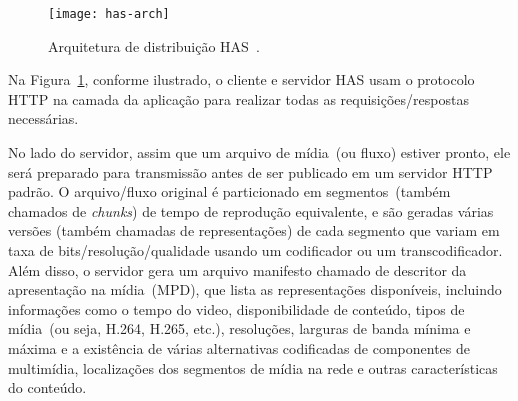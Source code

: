 \vspace{0.5cm}
\begin{figure}[htb]
  \centering
  \texttt{[image: has-arch]}
  \caption{Arquitetura de distribuição HAS~\cite{bentaleb:2018:MSys}.}
  \label{fig:has-arch}
\end{figure}

%

Na Figura~\ref{fig:has-arch}, conforme ilustrado, o cliente e servidor HAS usam o protocolo HTTP na camada da aplicação para realizar todas as requisições/respostas necessárias. 

No lado do servidor, assim que um arquivo de mídia~(ou fluxo) estiver pronto, ele será preparado para transmissão antes de ser publicado em um servidor HTTP padrão. O arquivo/fluxo original é particionado em segmentos~(também chamados de \textit{chunks}) de tempo de reprodução equivalente, e são geradas várias versões (também chamadas de representações) de cada segmento que variam em taxa de bits/resolução/qualidade usando um codificador ou um transcodificador. 
Além disso, o servidor gera um arquivo manifesto chamado de descritor da apresentação na mídia~(MPD), que lista as representações disponíveis, incluindo informações como o tempo do video, disponibilidade de conteúdo, tipos de mídia~(ou seja, H.264, H.265, etc.), resoluções, larguras de banda mínima e máxima e a existência de várias alternativas codificadas de componentes de multimídia, localizações dos segmentos de mídia na rede e outras características do conteúdo.

